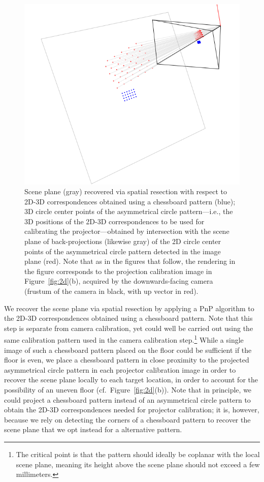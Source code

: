 \documentclass[review]{elsarticle}
\begin{document}
{\begin{figure}
    \centerline{\includegraphics[scale=.35]{images/2d3d.png}}
    \caption{Scene plane (gray) recovered via spatial resection with respect to 2D-3D correspondences obtained using a chessboard pattern (blue); 3D circle center points of the asymmetrical circle pattern---i.e., the 3D positions of the 2D-3D correspondences to be used for calibrating the projector---obtained by intersection with the scene plane of back-projections (likewise gray) of the 2D circle center points of the asymmetrical circle pattern detected in the image plane (red). Note that as in the figures that follow, the rendering in the figure corresponds to the projection calibration image in Figure~\ref{fig:2d}(b), acquired by the downwards-facing camera (frustum of the camera in black, with up vector in red).}
    \label{fig:3d}
\end{figure}

We recover the scene plane via spatial resection by applying a PnP algorithm \cite{collins2014infinitesimal} to the 2D-3D correspondences obtained using a chessboard pattern. Note that this step is separate from camera calibration, yet could well be carried out using the same calibration pattern used in the camera calibration step.\footnote{The critical point is that the pattern should ideally be coplanar with the local scene plane, meaning its height above the scene plane should not exceed a few millimeters.} While a single image of such a chessboard pattern placed on the floor could be sufficient if the floor is even, we place a chessboard pattern in close proximity to the projected asymmetrical circle pattern in each projector calibration image in order to recover the scene plane locally to each target location, in order to account for the possibility of an uneven floor (cf.\ Figure~\ref{fig:2d}(b)). Note that in principle, we could project a chessboard pattern instead of an asymmetrical circle pattern to obtain the 2D-3D correspondences needed for projector calibration; it is, however, because we rely on detecting the corners of a chessboard pattern to recover the scene plane that we opt instead for a alternative pattern.

}
\end{document}
